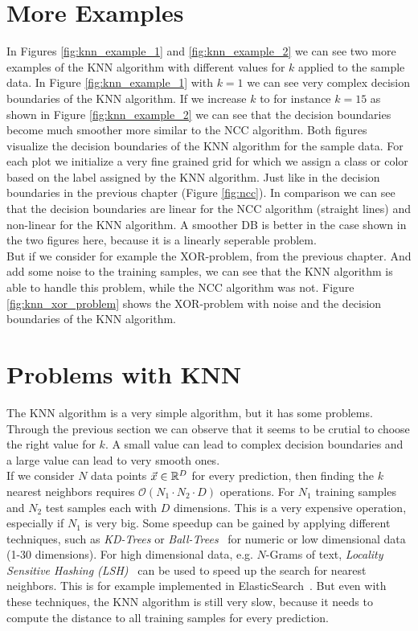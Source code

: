 \section{More Examples}
In Figures \ref{fig:knn_example_1} and \ref{fig:knn_example_2} we can see two more examples of the KNN algorithm with different values for $k$ applied to the sample data.
In Figure \ref{fig:knn_example_1} with $k=1$ we can see very complex decision boundaries of the KNN algorithm.
If we increase $k$ to for instance $k=15$ as shown in Figure \ref{fig:knn_example_2} we can see that the decision boundaries become much smoother more similar to the NCC algorithm.
Both figures visualize the decision boundaries of the KNN algorithm for the sample data.
For each plot we initialize a very fine grained grid for which we assign a class or color based on the label assigned by the KNN algorithm.
Just like in the decision boundaries in the previous chapter (Figure \ref{fig:ncc}).
In comparison we can see that the decision boundaries are linear for the NCC algorithm (straight lines) and non-linear for the KNN algorithm.
A smoother DB is better in the case shown in the two figures here, because it is a linearly seperable problem.\\
But if we consider for example the XOR-problem, from the previous chapter. And add some noise to the training samples, we can see that the KNN algorithm is able to handle this problem, while the NCC algorithm was not.
\framedtext{\color{red}{TODO: add XOR problem with noise and KNN example}}
Figure \ref{fig:knn_xor_problem} shows the XOR-problem with noise and the decision boundaries of the KNN algorithm.

\section{Problems with KNN}
The KNN algorithm is a very simple algorithm, but it has some problems.
Through the previous section we can observe that it seems to be crutial to choose the right value for $k$.
A small value can lead to complex decision boundaries and a large value can lead to very smooth ones.\\
If we consider $N$ data points $\vec{x}\in\mathbb{R}^D$ for every prediction, then finding the $k$ nearest neighbors requires $\mathcal{O}(N_1\cdot N_2\cdot D)$ operations.
For $N_1$ training samples and $N_2$ test samples each with $D$ dimensions.
This is a very expensive operation, especially if $N_1$ is very big.
Some speedup can be gained by applying different techniques, such as \textit{KD-Trees} or \textit{Ball-Trees}~\cite{scikit-learn} for numeric or low dimensional data (1-30 dimensions).
For high dimensional data, e.g. $N$-Grams of text, \textit{Locality Sensitive Hashing (LSH)}~\cite{scikit-learn} can be used to speed up the search for nearest neighbors. This is for example implemented in ElasticSearch~\cite{elasticsearch}.
But even with these techniques, the KNN algorithm is still very slow, because it needs to compute the distance to all training samples for every prediction.

